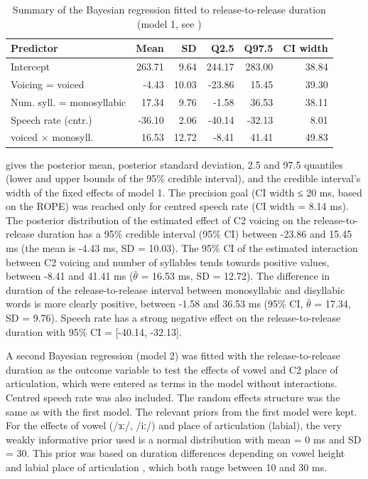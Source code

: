 \documentclass[12pt,a4paper,]{article}
\begin{document}
\begin{table}

\caption{\label{tab:rr-1-table}Summary of the Bayesian regression fitted to release-to-release duration (model 1, see )}
\centering
\fontsize{8}{10}\selectfont
\begin{tabular}[t]{lrrrrr}
\toprule
Predictor & Mean & SD & Q2.5 & Q97.5 & CI width\\
\midrule
Intercept & 263.71 & 9.64 & 244.17 & 283.00 & 38.84\\
Voicing = voiced & -4.43 & 10.03 & -23.86 & 15.45 & 39.30\\
Num. syll. = monosyllabic & 17.34 & 9.76 & -1.58 & 36.53 & 38.11\\
Speech rate (cntr.) & -36.10 & 2.06 & -40.14 & -32.13 & 8.01\\
voiced × monosyll. & 16.53 & 12.72 & -8.41 & 41.41 & 49.83\\
\bottomrule
\end{tabular}
\end{table}

 gives the posterior mean, posterior standard
deviation, 2.5 and 97.5 quantiles (lower and upper bounds of the 95\%
credible interval), and the credible interval's width of the fixed
effects of model 1. The precision goal (CI width ≤ 20 ms, based on the
ROPE) was reached only for centred speech rate (CI width = 8.14 ms). The
posterior distribution of the estimated effect of C2 voicing on the
release-to-release duration has a 95\% credible interval (95\% CI)
between -23.86 and 15.45 ms (the mean is -4.43 ms, SD = 10.03). The 95\%
CI of the estimated interaction between C2 voicing and number of
syllables tends towards positive values, between -8.41 and 41.41 ms
(\(\bar{\theta}\) = 16.53 ms, SD = 12.72). The difference in duration of
the release-to-release interval between monosyllabic and disyllabic
words is more clearly positive, between -1.58 and 36.53 ms (95\% CI,
\(\bar{\theta}\) = 17.34, SD = 9.76). Speech rate has a strong negative
effect on the release-to-release duration with 95\% CI = {[}-40.14,
-32.13{]}.

A second Bayesian regression (model 2) was fitted with the
release-to-release duration as the outcome variable to test the effects
of vowel and C2 place of articulation, which were entered as terms in
the model without interactions. Centred speech rate was also included.
The random effects structure was the same as with the first model. The
relevant priors from the first model were kept. For the effects of vowel
(/ɜː/, /iː/) and place of articulation (labial), the very weakly
informative prior used is a normal distribution with mean = 0 ms and SD
= 30. This prior was based on duration differences depending on vowel
height \citep{heffner1937, house1953, hertrich1997} and labial place of
articulation \citep{sharf1962}, which both range between 10 and 30 ms.
\end{document}
